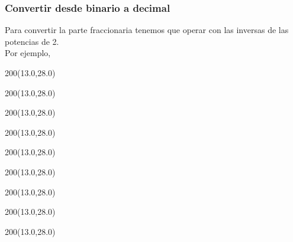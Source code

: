 \documentclass[aspectratio=169]{beamer}
\begin{document}
\begin{frame}[fragile,t]
    \frametitle{Convertir desde binario a decimal}
    Para convertir la parte fraccionaria tenemos que operar con las inversas de las potencias de 2.\\
    Por ejemplo,
    \begin{textblock}{200}(13.0,28.0)   \end{textblock}
    \begin{textblock}{200}(13.0,28.0)   \end{textblock}
    \begin{textblock}{200}(13.0,28.0)   \end{textblock}
    \begin{textblock}{200}(13.0,28.0)   \end{textblock}
    \begin{textblock}{200}(13.0,28.0)   \end{textblock}
    \begin{textblock}{200}(13.0,28.0)   \end{textblock}
    \begin{textblock}{200}(13.0,28.0)   \end{textblock}
    \begin{textblock}{200}(13.0,28.0)   \end{textblock}
    \begin{textblock}{200}(13.0,28.0)   \end{textblock}
\end{frame}
\end{document}
